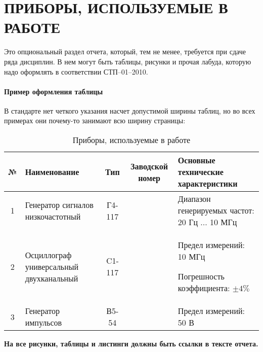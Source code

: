 \section{ПРИБОРЫ, ИСПОЛЬЗУЕМЫЕ В РАБОТЕ}

Это опциональный раздел отчета, который, тем не менее, требуется при сдаче ряда дисциплин.
В нем могут быть таблицы, рисунки и прочая лабуда, которую надо оформлять в соответствии СТП–01–2010.

\paragraph{Пример оформления таблицы} В стандарте нет четкого указания насчет допустимой ширины таблиц, но во всех примерах они почему-то 
занимают всю ширину страницы:

\begin{table}[h!]
  \caption{Приборы, используемые в работе}
  \renewcommand{\tabcolsep}{0.7em}
  \begin{tabularx}{\textwidth}{| c | X | c | c | X |} %
  \hline
   № &  Наименование & Тип & Заводской номер & Основные технические характеристики \\ \hline

   1 & Генератор сигналов низкочастотный & Г4-117 & &
   Диапазон генерируемых частот: 20 Гц $ ... $ 10 МГц \\ \hline

   2 & Осциллограф универсальный двухканальный & C1-117 & &
   Предел измерений: 10 МГц \par
   Погрешность коэффициента: $ \pm4 \% $ \\ \hline

   3 & Генератор импульсов & В5-54 & &
   Предел измерений: 50 В \\ \hline  
  \end{tabularx}
\end{table}

\textbf{На все рисунки, таблицы и листинги должны быть ссылки в тексте отчета.}

\newpage